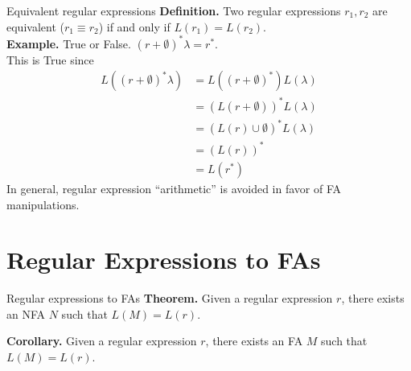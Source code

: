 \documentclass[10pt]{beamer}
\begin{document}
\begin{frame}{Equivalent regular expressions}
    \textbf{Definition.} Two regular expressions $r_1,r_2$ are equivalent ($r_1 \equiv r_2$) if and only if $L(r_1) = L(r_2)$.\\ \bigskip
    \textbf{Example.} True or False. $(r+\emptyset)^*\lambda = r^*$.\\
    This is True since
    \begin{align*}
        L((r+\emptyset)^*\lambda) & = L((r+\emptyset)^*)L(\lambda)      \\
                                  & = (L(r+\emptyset))^*L(\lambda)      \\
                                  & = (L(r) \cup \emptyset)^*L(\lambda) \\
                                  & = (L(r))^*                          \\
                                  & = L(r^*)
    \end{align*}
    In general, regular expression ``arithmetic'' is avoided in favor of FA manipulations.
\end{frame}

\section{Regular Expressions to FAs}

\begin{frame}{Regular expressions to FAs}
    \textbf{Theorem.} Given a regular expression $r$, there exists an NFA $N$ such that $L(M) = L(r)$.

    \textbf{Corollary.} Given a regular expression $r$, there exists an FA $M$ such that $L(M) = L(r)$.
\end{frame}
\end{document}
